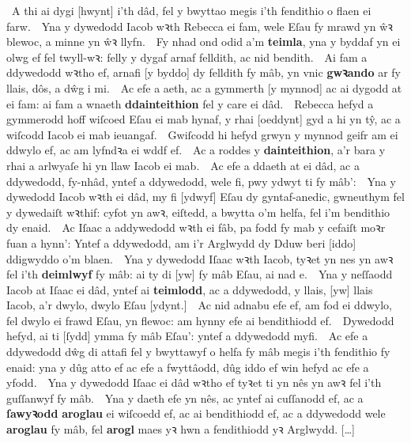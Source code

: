 \begin{Parallel}{0.425\textwidth}{0.545\textwidth}
{	~A thi ai dygi [hwynt] i’th dâd, fel y bwyttao megis i’th fendithio o flaen ei farw.\ 
	~Yna y dywedodd Iacob wꝛth Rebecca ei fam, wele Eſau fy mrawd yn ŵꝛ blewoc, a minne yn ŵꝛ llyfn.\ 
	~Fy nhad ond odid a’m \textbf{teimla}, yna y byddaf yn ei olwg ef fel twyll-wꝛ: felly y dygaf arnaf felldith, ac nid bendith.\ 
	~Ai fam a ddywedodd wꝛtho ef, arnafi [y byddo] dy felldith fy mâb, yn vnic \textbf{gwꝛando} ar fy llais, dôs, a dŵg i mi.\ 
	~Ac efe a aeth, ac a gymmerth [y mynnod] ac ai dygodd at ei fam: ai fam a wnaeth \textbf{ddainteithion} fel y care ei dâd.\ 
	~Rebecca hefyd a gymmerodd hoff wiſcoed Eſau ei mab hynaf, y rhai [oeddynt] gyd a hi yn tŷ, ac a wiſcodd Iacob ei mab ieuangaf.\ 
	~Gwiſcodd hi hefyd grwyn y mynnod geifr am ei ddwylo ef, ac am lyfndꝛa ei wddf ef.\ 
	~Ac a roddes y \textbf{dainteithion}, a’r bara y rhai a arlwyaſe hi yn llaw Iacob ei mab.\ 
	~Ac efe a ddaeth at ei dâd, ac a ddywedodd, fy-nhâd, yntef a ddywedodd, wele fi, pwy ydwyt ti fy mâb’:\ 
	~Yna y dywedodd Iacob wꝛth ei dâd, my fi [ydwyf] Eſau dy gyntaf-anedic, gwneuthym fel y dywedaiſt wꝛthif: cyfot yn awꝛ, eiſtedd, a bwytta o’m helfa, fel i’m bendithio dy enaid.\ 
	~Ac Iſaac a addywedodd wꝛth ei fâb, pa fodd fy mab y cefaiſt moꝛr fuan a hynn’: Yntef a ddywedodd, am i’r Arglwydd dy Dduw beri [iddo] ddigwyddo o’m blaen.\ 
	~Yna y dywedodd Iſaac wꝛth Iacob, tyꝛet yn nes yn awꝛ fel i’th \textbf{deimlwyf} fy mâb: ai ty di [yw] fy mâb Eſau, ai nad e.\ 
	~Yna y neſſaodd Iacob at Iſaac ei dâd, yntef ai \textbf{teimlodd}, ac a ddywedodd, y llais, [yw] llais Iacob, a’r dwylo, dwylo Eſau [ydynt.]\ 
	~Ac nid adnabu efe ef, am fod ei ddwylo, fel dwylo ei frawd Eſau, yn flewoc: am hynny efe ai bendithiodd ef.\ 
	~Dywedodd hefyd, ai ti [ſydd] ymma fy mâb Eſau’: yntef a ddywedodd myfi.\ 
	~Ac efe a ddywedodd dŵg di attafi fel y bwyttawyf o helfa fy mâb megis i’th fendithio fy enaid: yna y dûg atto ef ac efe a fwyttâodd, dûg iddo ef win hefyd ac efe a yfodd.\ 
	~Yna y dywedodd Iſaac ei dâd wꝛtho ef tyꝛet ti yn nês yn awꝛ fel i’th guſſanwyf fy mâb.\ 
	~Yna y daeth efe yn nês, ac yntef ai cuſſanodd ef, ac a \textbf{ſawyꝛodd} \textbf{aroglau} ei wiſcoedd ef, ac ai bendithiodd ef, ac a ddywedodd wele \textbf{aroglau} fy mâb, fel \textbf{arogl} maes yꝛ hwn a fendithiodd yꝛ Arglwydd.
	[…]
}
\end{Parallel}

